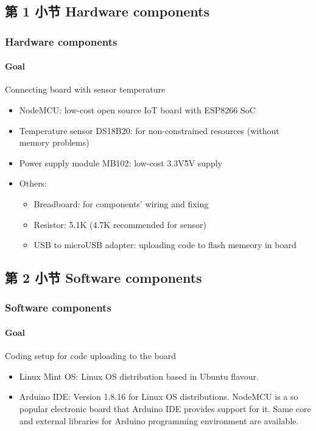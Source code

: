 \documentclass[
    aspectratio=169,                   %
]{beamer}
\begin{document}
\subsection{第 1 小节 Hardware components}

    \begin{frame}
        \frametitle{Hardware components}

        \paragraph{Goal} Connecting board with sensor temperature 

        \begin{itemize}
            \item \alert{NodeMCU\cite{nodemcu}}: low-cost open source IoT board with ESP8266 SoC
            \item \alert{Temperature sensor DS18B20\cite{ds18b20}}: for non-constrained resources (without memory problems)
            \item \alert{Power supply module MB102}: low-cost 3.3V\~5V supply
            \item \alert{Others:}
            \begin{itemize}
                \item \alert{Breadboard}: for components' wiring and fixing
                \item \alert{Resistor}: 5.1K (4.7K recommended for sensor)
                \item \alert{USB to microUSB adapter}: uploading code to flash memeory in board      
            \end{itemize}
        \end{itemize}

    \end{frame}

\subsection{第 2 小节 Software components}

    \begin{frame}
        \frametitle{Software components}

        \paragraph{Goal} Coding setup for code uploading to the board

        \begin{itemize}
            \item \alert{Linux Mint OS}: Linux OS distribution based in Ubuntu flavour.
            \item \alert{Arduino IDE\cite{arduinoide}}: Version 1.8.16 for Linux OS distributions. NodeMCU is a so popular electronic board that Arduino IDE provides support for it. Same core and external libraries for Arduino programming environment are available.
        \end{itemize}

    \end{frame}
\end{document}
